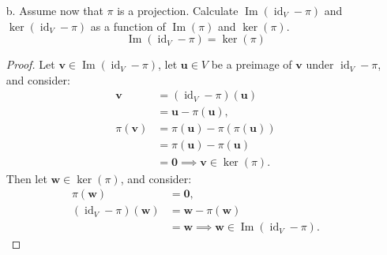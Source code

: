 \documentclass[11pt]{article}
\newcommand{\vect}[1]{\bm{#1}}      %
\DeclareMathOperator{\Img}{Im}
\DeclareMathOperator{\id}{id}
\theoremstyle{definition}
\theoremstyle{plain}
\theoremstyle{remark}
\begin{document}
\begin{enumerate}
\begin{enumerate}
                    \begin{proof}
                        Define $\rho = \id_V - \pi$.  Then
                        \[
                            \rho^2 = \id_V - 2 \pi + \pi^2.
                        \]
                        \[
                            \rho^2 = \rho
                            \begin{aligned}
                                 & \quad \iff \quad
                                \id_V - 2 \pi + \pi^2 = \id_V - \pi \\
                                 & \quad \iff \quad
                                \pi^2 = \pi                         \\
                            \end{aligned}
                        \]
                    \end{proof}

              \item[b.] Assume now that $\pi$ is a projection.  Calculate $\Img(\id_V - \pi)$ and $\ker(\id_V
                        - \pi)$ as a function of $\Img(\pi)$ and $\ker(\pi)$.
                    \[
                        \Img(\id_V - \pi) = \ker(\pi)
                    \]
                    \begin{proof}
                        Let $\vect{v} \in \Img(\id_V - \pi)$, let $\vect{u} \in V$ be a preimage of $\vect{v}$ under $\id_V - \pi$, and consider:
                        \[
                            \begin{aligned}
                                \vect{v}      & = (\id_V - \pi)(\vect{u})                   \\
                                              & = \vect{u} - \pi(\vect{u}),                 \\
                                \pi(\vect{v}) & = \pi(\vect{u}) - \pi(\pi(\vect{u}))        \\
                                              & = \pi(\vect{u}) - \pi(\vect{u})             \\
                                              & = \vect{0} \implies \vect{v} \in \ker(\pi).
                            \end{aligned}
                        \]
                        Then let $\vect{w} \in \ker(\pi)$, and consider:
                        \[
                            \begin{aligned}
                                \pi(\vect{w})           & = \vect{0},                                         \\
                                (\id_V - \pi)(\vect{w}) & = \vect{w} - \pi(\vect{w})                          \\
                                                        & = \vect{w} \implies \vect{w} \in \Img(\id_V - \pi).
                            \end{aligned}
                        \]
                    \end{proof}


\end{enumerate}
\end{enumerate}
\end{document}
